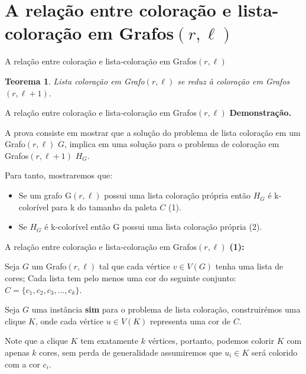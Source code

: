 \documentclass[9pt, compress]{beamer}
\newtheorem{teorema}{Teorema}
\newcommand{\?}{\textcolor{warn}{\textit{?}}}
\begin{document}
    \section{A relação entre coloração e lista-coloração em Grafos$(r,\ell)$}
    \begin{frame}{A relação entre coloração e lista-coloração em Grafos$(r,\ell)$}
        \begin{teorema}
          Lista coloração em Grafo$(r,\ell)$ se reduz à coloração em Grafos$(r,\ell+1)$. 
        \end{teorema}
    \end{frame}
    \begin{frame}{A relação entre coloração e lista-coloração em Grafos$(r,\ell)$}
        \textbf{Demonstração.}
        
        A prova consiste em mostrar que a solução do problema de lista coloração em um Grafo$(r,\ell)$ $G$, implica em uma solução para o problema de coloração em Grafos$(r,\ell+1)$ $H_G$.
        
        Para tanto, mostraremos que:
          \begin{itemize}
        \item Se um grafo G$(r,\ell)$ possui uma lista coloração própria então $H_G$ é k-colorível para k do tamanho da paleta $C$ (1).
		\item Se $H_G$ é k-colorível então G possui uma lista coloração própria (2).
      \end{itemize}
    \end{frame}
    \begin{frame}{A relação entre coloração e lista-coloração em Grafos$(r,\ell)$}
      \textbf{(1):}
      
      Seja $G$ um Grafo$(r,\ell)$ tal que cada vértice $v \in V(G)$ tenha uma lista de cores; 
      Cada lista tem pelo menos uma cor do seguinte conjunto: $C = \{c_1,c_2,c_3,...,c_k \}$. 
      \begin{center}
        \begin{figure}
        
      \end{figure}
      \end{center}
    \end{frame}
    \begin{frame}
      Seja $G$ uma instância \textbf{sim} para o problema de lista coloração, construirémos uma clique $K$, onde cada vértice $u \in V(K)$ representa uma cor de $C$.
      \begin{center}
      \begin{figure}
        
      \end{figure}  
      \end{center}
      Note que a clique $K$ tem exatamente $k$ vértices, portanto, podemos colorir $K$ com apenas $k$ cores, sem perda de generalidade assumiremos que $u_i \in K$ será colorido com a cor $c_i$.
    \end{frame}
\end{document}
